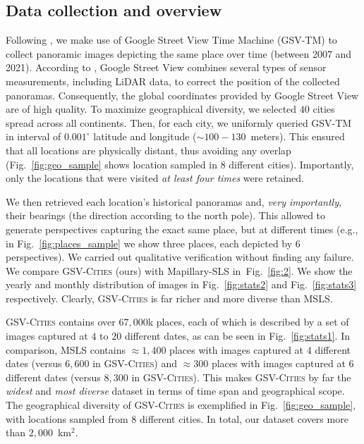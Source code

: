 \documentclass{article}
\begin{document}
\subsection{Data collection and overview}\label{sec:dataset}
Following \cite{arandjelovic2016netvlad, torii201524}, we make use of Google Street View Time Machine (GSV-TM) to collect panoramic images depicting the same place over time (between 2007 and 2021). According to \cite{5481932, klingner2013street}, Google Street View combines several types of sensor measurements, including LiDAR data, to correct the position of the collected panoramas. Consequently, the global coordinates provided by Google Street View are of high quality. To maximize geographical diversity, we selected $40$ cities spread across all continents. Then, for each city, we uniformly queried GSV-TM in interval of $0.001^{\circ}$ latitude and longitude ($\sim100-130$~meters). This ensured that all locations are physically distant, thus avoiding any overlap (Fig.~\ref{fig:geo_sample} shows location sampled in $8$ different cities). Importantly, only the locations that were visited \emph{at least four times} were retained. 

We then retrieved each location's historical panoramas and, \emph{very importantly}, their bearings (the direction according to the north pole). This allowed to generate perspectives capturing the exact same place, but at different times (e.g., in Fig.~\ref{fig:places_sample} we show three places, each depicted by $6$ perspectives). We carried out qualitative verification without finding any failure. We compare \textsc{GSV-Cities} (ours) with Mapillary-SLS in~Fig.~\ref{fig:2}.
We show the yearly and monthly distribution of images in Fig.~\ref{fig:stats2} and  Fig.~\ref{fig:stats3} respectively. Clearly, \textsc{GSV-Cities} is far richer and more diverse than MSLS.

\textsc{GSV-Cities} contains over $67,000$k places, each of which is described by a set of images captured at $4$ to $20$ different dates, as can be seen in Fig.~\ref{fig:stats1}. In comparison, MSLS contains $\approx 1,400$ places with images captured at $4$ different dates (versus $6,600$ in \textsc{GSV-Cities}) and $\approx 300$ places with images captured at $6$ different dates (versus $8,300$ in \mbox{\textsc{GSV-Cities}}). This makes \textsc{GSV-Cities} by far the \emph{widest} and \emph{most diverse} dataset in terms of time span and geographical scope. The geographical diversity of \textsc{GSV-Cities} is exemplified in Fig.~\ref{fig:geo_sample}, with locations sampled from $8$ different cities. In total, our dataset covers more than $2,000$~km$^2$.
\end{document}
